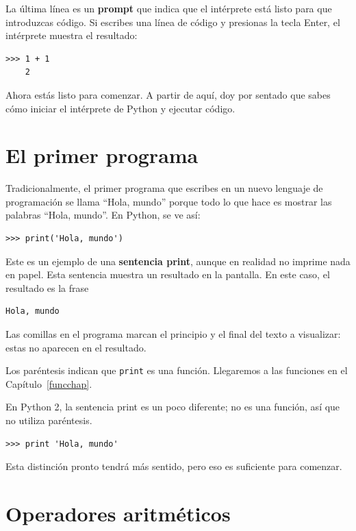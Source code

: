 \documentclass[10pt]{book}
\begin{document}
La última línea es un {\bf prompt} que indica que el intérprete está listo
para que introduzcas código.
Si escribes una línea de código y presionas la tecla Enter, el intérprete
muestra el resultado:

\begin{verbatim}
>>> 1 + 1
    2
\end{verbatim}
%
Ahora estás listo para comenzar.
A partir de aquí, doy por sentado que sabes cómo iniciar el intérprete de Python
y ejecutar código.


\section{El primer programa}
\label{hello}

Tradicionalmente, el primer programa que escribes en un nuevo lenguaje
de programación se llama ``Hola, mundo'' porque todo lo que hace es mostrar
las palabras ``Hola, mundo''.  En Python, se ve así:

\begin{verbatim}
>>> print('Hola, mundo')
\end{verbatim}
%
Este es un ejemplo de una {\bf sentencia print}, aunque
en realidad no imprime nada en papel.  Esta sentencia muestra un resultado en la
pantalla.  En este caso, el resultado es la frase

\begin{verbatim}
Hola, mundo
\end{verbatim}
%
Las comillas en el programa marcan el principio y el final
del texto a visualizar: estas no aparecen en el resultado.

Los paréntesis indican que {\tt print} es una función.  Llegaremos
a las funciones en el Capítulo~\ref{funcchap}.
 

En Python 2, la sentencia print es un poco diferente; no es
una función, así que no utiliza paréntesis.

\begin{verbatim}
>>> print 'Hola, mundo'
\end{verbatim}
%
Esta distinción pronto tendrá más sentido, pero eso es suficiente para
comenzar.


\section{Operadores aritméticos}
\end{document}
